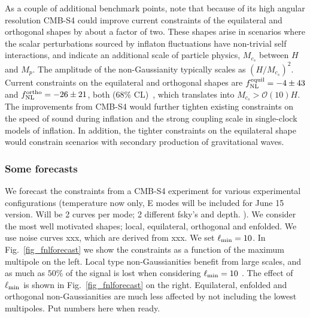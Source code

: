 As a couple of additional benchmark points, note that because of its high angular resolution CMB-S4 could improve current constraints of the equilateral and orthogonal shapes by about a factor of two. These shapes arise in scenarios where the scalar perturbations sourced by inflaton fluctuations have non-trivial self interactions, and indicate an additional scale of particle physics, $M_{c_s}$ between $H$ and $M_p$. The amplitude of the non-Gaussianity typically scales as $(H/M_{c_s})^2$. Current constraints on the equilateral and orthogonal shapes are $f_{\rm NL}^{\rm equil} = -4 \pm 43$ and $f_{\rm NL}^{\rm ortho} = -26 \pm 21$, both (68\% CL)~\cite{Ade:2015ava}, which translates into $M_{c_s}>\mathcal{O}(10)H$. The improvements from CMB-S4 would further tighten existing constraints on the speed of sound during inflation and the strong coupling scale in single-clock models of inflation. In addition, the tighter constraints on the equilateral shape would constrain scenarios with secondary production of gravitational waves.



\subsubsection{Some forecasts}
We forecast the constraints from a CMB-S4 experiment for various experimental configurations (temperature now only, E modes will be included for June 15 version. Will be 2 curves per mode; 2 different fsky's and depth. ). We consider the most well motivated shapes; local, equilateral, orthogonal and enfolded. We use noise curves xxx, which are derived from xxx. We set $\ell_{\rm min} = 10$. In Fig.~\ref{fig_fnlforecast} we show the constraints as a function of the maximum multipole on the left. Local type non-Gaussianities benefit from large scales, and as much as $50\%$ of the signal is lost when considering $\ell_{\rm min} = 10$ \cite{Need citation}. The effect of $\ell_{\rm min}$ is shown in Fig.~\ref{fig_fnlforecast} on the right. Equilateral, enfolded and orthogonal non-Gaussianities are much less affected by not including the lowest multipoles. {\color{red} Put numbers here when ready}. 

